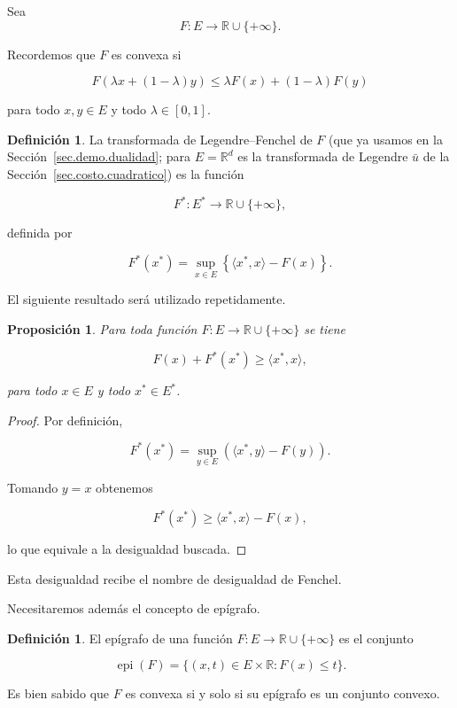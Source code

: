 \documentclass[12pt, a4paper]{amsbook}
\newcommand{\R}{{\mathbb R}}
\newtheorem{prop}[teo]{Proposición}
\theoremstyle{remark}
\theoremstyle{definition}
\newtheorem{defi}[teo]{Definición}
\numberwithin{section}{chapter}
\numberwithin{subsection}{section}
\numberwithin{equation}{section}
\numberwithin{figure}{chapter}
\begin{document}
Sea
\[
F:E\longrightarrow\mathbb R\cup\{+\infty\}.
\]

Recordemos que $F$ es convexa si

\[
F(\lambda x+(1-\lambda)y)
\le
\lambda F(x)
+
(1-\lambda)F(y)
\]

para todo $x,y\in E$ y todo $\lambda\in[0,1]$.

\begin{defi}
La transformada de Legendre--Fenchel de $F$ (que ya usamos en la
Sección~\ref{sec.demo.dualidad}; para $E=\R^d$ es la transformada de
Legendre $\bar u$ de la Sección~\ref{sec.costo.cuadratico}) es la función

\[
F^*:E^*\longrightarrow\mathbb R\cup\{+\infty\},
\]

definida por

\[
F^*(x^*)
=
\sup_{x\in E}
\left\{
\langle x^*,x\rangle
-
F(x)
\right\}.
\]
\end{defi}

El siguiente resultado será utilizado repetidamente.

\begin{prop}
Para toda función $F:E\to\mathbb R\cup\{+\infty\}$ se tiene

\[
F(x)+F^*(x^*)
\ge
\langle x^*,x\rangle,
\]

para todo $x\in E$ y todo $x^*\in E^*$.
\end{prop}

\begin{proof}
Por definición,

\[
F^*(x^*)
=
\sup_{y\in E}
\left(
\langle x^*,y\rangle-F(y)
\right).
\]

Tomando $y=x$ obtenemos

\[
F^*(x^*)
\ge
\langle x^*,x\rangle
-
F(x),
\]

lo que equivale a la desigualdad buscada.
\end{proof}

Esta desigualdad recibe el nombre de desigualdad de Fenchel.

\bigskip

Necesitaremos además el concepto de epígrafo.

\begin{defi}
El epígrafo de una función
$F:E\to\mathbb R\cup\{+\infty\}$
es el conjunto

\[
\operatorname{epi}(F)
=
\{
(x,t)\in E\times\mathbb R:
F(x)\le t
\}.
\]
\end{defi}

Es bien sabido que $F$ es convexa si y solo si su epígrafo es un conjunto
convexo.
\end{document}
